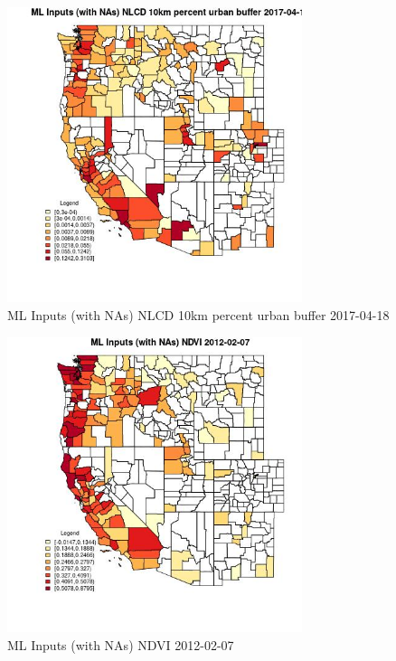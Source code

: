 \begin{figure} 
\centering  
\includegraphics[width=0.77\textwidth]{Code_Outputs/Report_ML_input_PM25_Step4_part_f_de_duplicated_aves_prioritize_24hr_obswNAs_CountyNLCD_10km_percent_urban_bufferMean2017-04-18.jpg} 
\caption{\label{fig:Report_ML_input_PM25_Step4_part_f_de_duplicated_aves_prioritize_24hr_obswNAsCountyNLCD_10km_percent_urban_bufferMean2017-04-18}ML Inputs (with NAs) NLCD 10km percent urban buffer 2017-04-18} 
\end{figure} 
 

\begin{figure} 
\centering  
\includegraphics[width=0.77\textwidth]{Code_Outputs/Report_ML_input_PM25_Step4_part_f_de_duplicated_aves_prioritize_24hr_obswNAs_CountyNDVIMean2012-02-07.jpg} 
\caption{\label{fig:Report_ML_input_PM25_Step4_part_f_de_duplicated_aves_prioritize_24hr_obswNAsCountyNDVIMean2012-02-07}ML Inputs (with NAs) NDVI 2012-02-07} 
\end{figure} 
 

